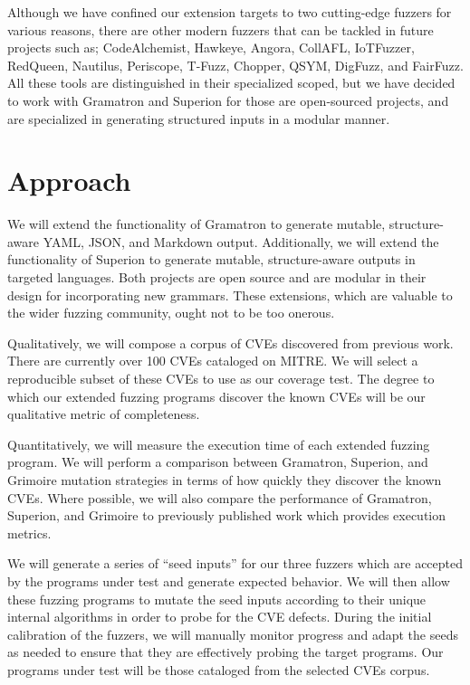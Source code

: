\documentclass[12pt]{diazessay}
\begin{document}
Although we have confined our extension targets to two cutting-edge fuzzers for various reasons, there are other modern fuzzers that can be tackled in future projects such as;
CodeAlchemist\cite{CodeAlchemist1}\cite{CodeAlchemist2}, Hawkeye\cite{Hawkeye}, Angora\cite{Angora1}\cite{Angora2}, CollAFL\cite{CollAFL}, IoTFuzzer\cite{IoTFuzzer}, RedQueen\cite{redqueen}, Nautilus\cite{Nautilus1}\cite{Nautilus2}, Periscope\cite{PeriScope1}\cite{PeriScope2}, T-Fuzz\cite{TFuzz1}\cite{TFuzz2}, Chopper\cite{Chopper}, QSYM\cite{QSYM1}\cite{QSYM2}, DigFuzz\cite{DigFuzz}, and FairFuzz\cite{FairFuzz1}\cite{FairFuzz2}.
All these tools are distinguished in their specialized scoped, but we have decided to work with Gramatron and Superion for those are open-sourced projects, and are specialized in generating structured inputs in a modular manner.



\section*{Approach}

We will extend the functionality of Gramatron to generate mutable, structure-aware YAML, JSON, and Markdown output.
Additionally, we will extend the functionality of Superion to generate mutable, structure-aware outputs in targeted languages.
Both projects are open source and are modular in their design for incorporating new grammars.
These extensions, which are valuable to the wider fuzzing community, ought not to be too onerous.

Qualitatively, we will compose a corpus of CVEs discovered from previous work.
There are currently over 100 CVEs cataloged on MITRE\cite{MITRE}.
We will select a reproducible subset of these CVEs to use as our coverage test.
The degree to which our extended fuzzing programs discover the known CVEs will be our qualitative metric of completeness.

Quantitatively, we will measure the execution time of each extended fuzzing program.
We will perform a comparison between Gramatron, Superion, and Grimoire mutation strategies in terms of how quickly they discover the known CVEs.
Where possible, we will also compare the performance of Gramatron, Superion, and Grimoire to previously published work which provides execution metrics.

We will generate a series of ``seed inputs'' for our three fuzzers which are accepted by the programs under test and generate expected behavior.
We will then allow these fuzzing programs to mutate the seed inputs\cite{Seed} according to their unique internal algorithms in order to probe for the CVE defects.
During the initial calibration of the fuzzers, we will manually monitor progress and adapt the seeds as needed to ensure that they are effectively probing the target programs.
Our programs under test will be those cataloged from the selected CVEs corpus.
\end{document}
